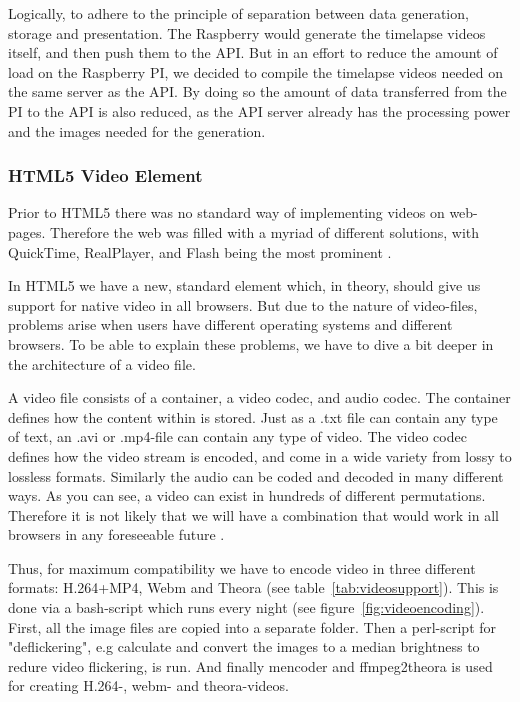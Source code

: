 Logically, to adhere to the principle of separation between data generation, storage and presentation. The Raspberry would generate the timelapse videos itself, and then push them to the API. But in an effort to reduce the amount of load on the Raspberry PI, we decided to compile the timelapse videos needed on the same server as the API. By doing so the amount of data transferred from the PI to the API is also reduced, as the API server already has the processing power and the images needed for the generation. 

\subsubsection{HTML5 Video Element}
Prior to HTML5 there was no standard way of implementing videos on web-pages. Therefore the web was filled with a myriad of different solutions, with QuickTime, RealPlayer, and Flash being the most prominent \citep{pilgrim2010html5}.

In HTML5 we have a new, standard \verb@video@ element which, in theory, should give us support for native video in all browsers. But due to the nature of video-files, problems arise when users have different operating systems and different browsers. To be able to explain these problems, we have to dive a bit deeper in the architecture of a video file.

A video file consists of a container, a video codec, and audio codec. The container defines how the content within is stored. Just as a .txt file can contain any type of text, an .avi or .mp4-file can contain any type of video. The video codec defines how the video stream is encoded, and come in a wide variety from lossy to lossless formats. Similarly the audio can be coded and decoded in many different ways. As you can see, a video can exist in hundreds of different permutations. Therefore it is not likely that we will have a combination that would work in all browsers in any foreseeable future \citep{pilgrim2010html5}.

Thus, for maximum compatibility we have to encode video in three different formats: H.264+MP4, Webm and Theora (see table~\ref{tab:videosupport}). This is done via a bash-script which runs every night (see figure~\ref{fig:videoencoding}). First, all the image files are copied into a separate folder. Then a perl-script for "deflickering", e.g calculate and convert the images to a median brightness to redure video flickering, is run. And finally mencoder and ffmpeg2theora is used for creating H.264-, webm- and theora-videos.  

